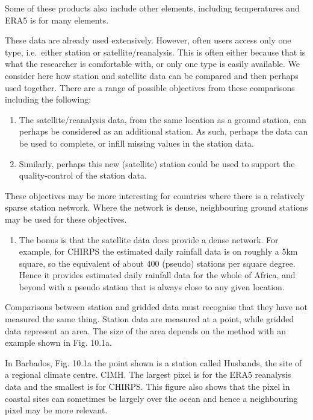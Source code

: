 \documentclass[
  letterpaper,
  DIV=11,
  numbers=noendperiod]{scrreprt}
\providecommand{\tightlist}{%
  \setlength{\itemsep}{0pt}\setlength{\parskip}{0pt}}\usepackage{longtable,booktabs,array}
\begin{document}
Some of these products also include other elements, including
temperatures and ERA5 is for many elements.

These data are already used extensively. However, often users access
only one type, i.e.~either station or satellite/reanalysis. This is
often either because that is what the researcher is comfortable with, or
only one type is easily available. We consider here how station and
satellite data can be compared and then perhaps used together. There are
a range of possible objectives from these comparisons including the
following:

\begin{enumerate}
\def\labelenumi{\alph{enumi})}
\item
  The satellite/reanalysis data, from the same location as a ground
  station, can perhaps be considered as an additional station. As such,
  perhaps the data can be used to complete, or infill missing values in
  the station data.
\item
  Similarly, perhaps this new (satellite) station could be used to
  support the quality-control of the station data.
\end{enumerate}

These objectives may be more interesting for countries where there is a
relatively sparse station network. Where the network is dense,
neighbouring ground stations may be used for these objectives.

\begin{enumerate}
\def\labelenumi{\alph{enumi})}
\setcounter{enumi}{2}
\tightlist
\item
  The bonus is that the satellite data does provide a dense network. For
  example, for CHIRPS the estimated daily rainfall data is on roughly a
  5km square, so the equivalent of about 400 (pseudo) stations per
  square degree. Hence it provides estimated daily rainfall data for the
  whole of Africa, and beyond with a pseudo station that is always close
  to any given location.
\end{enumerate}

Comparisons between station and gridded data must recognise that they
have not measured the same thing. Station data are measured at a point,
while gridded data represent an area. The size of the area depends on
the method with an example shown in Fig. 10.1a.

In Barbados, Fig. 10.1a the point shown is a station called Husbands,
the site of a regional climate centre. CIMH. The largest pixel is for
the ERA5 reanalysis data and the smallest is for CHIRPS. This figure
also shows that the pixel in coastal sites can sometimes be largely over
the ocean and hence a neighbouring pixel may be more relevant.
\end{document}
